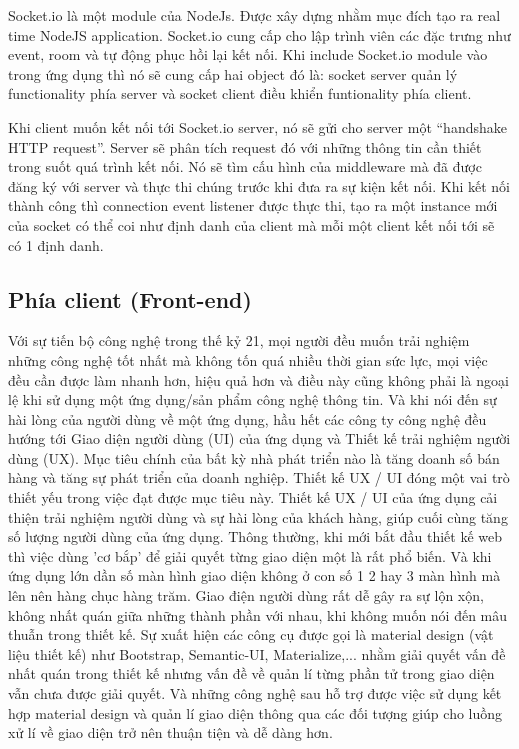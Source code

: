 Socket.io là một module của NodeJs. Được xây dựng nhằm mục đích tạo ra real time NodeJS application. Socket.io cung cấp cho lập trình viên các đặc trưng như event, room và tự động phục hồi lại kết nối. Khi include Socket.io module vào trong ứng dụng thì  nó sẽ cung cấp hai object đó là: socket server quản lý functionality phía server và socket client điều khiển funtionality phía client.

Khi client muốn kết nối tới Socket.io server, nó sẽ gửi cho server một “handshake HTTP request”. Server sẽ phân tích request đó với những thông tin cần thiết trong suốt quá trình kết nối. Nó sẽ tìm cấu hình của middleware mà đã được đăng ký với server và thực thi chúng trước khi đưa ra sự kiện kết nối. Khi kết nối thành công thì connection event listener được thực thi, tạo ra một instance mới của socket có thể coi như định danh của client mà mỗi một client kết nối tới sẽ có 1 định danh.

\subsection{Phía client (Front-end)}
Với sự tiến bộ công nghệ trong thế kỷ 21, mọi người đều muốn trải nghiệm những công nghệ tốt nhất mà không tốn quá nhiều thời gian sức lực, mọi việc đều cần được làm nhanh hơn, hiệu quả hơn và điều này cũng không phải là ngoại lệ khi sử dụng một ứng dụng/sản phẩm công nghệ thông tin. Và khi nói đến sự hài lòng của người dùng về một ứng dụng, hầu hết các công ty công nghệ đều hướng tới Giao diện người dùng (UI) của ứng dụng và Thiết kế trải nghiệm người dùng (UX). Mục tiêu chính của bất kỳ nhà phát triển nào là tăng doanh số bán hàng và tăng sự phát triển của doanh nghiệp. Thiết kế UX / UI đóng một vai trò thiết yếu trong việc đạt được mục tiêu này. Thiết kế UX / UI của ứng dụng cải thiện trải nghiệm người dùng và sự hài lòng của khách hàng, giúp cuối cùng tăng số lượng người dùng của ứng dụng.
Thông thường, khi mới bắt đầu thiết kế web thì việc dùng 'cơ bắp' để giải quyết từng giao diện một là rất phổ biến. Và khi ứng dụng lớn dần số màn hình giao diện không ở con số 1 2 hay 3 màn hình mà lên nên hàng chục hàng trăm. Giao điện người dùng rất dễ gây ra sự lộn xộn, không nhất quán giữa những thành phần với nhau, khi không muốn nói đến mâu thuẫn trong thiết kế. Sự xuất hiện các công cụ được gọi là material design (vật liệu thiết kế) như Bootstrap, Semantic-UI, Materialize,... nhằm giải quyết vấn đề nhất quán trong thiết kế nhưng vấn đề về quản lí từng phần tử trong giao diện vẫn chưa được giải quyết. Và những công nghệ sau hỗ trợ được việc sử dụng kết hợp material design và quản lí giao diện thông qua các đối tượng  giúp cho luồng xử lí về giao diện trở nên thuận tiện và dễ dàng hơn.
